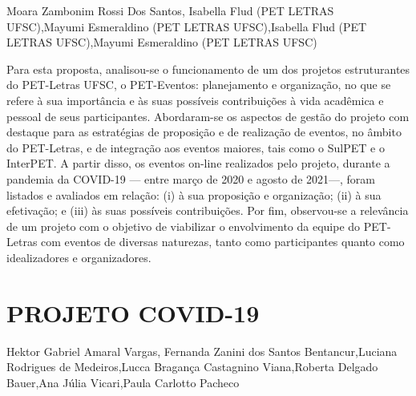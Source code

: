 Moara Zambonim Rossi Dos Santos, Isabella Flud (PET LETRAS UFSC),Mayumi Esmeraldino (PET LETRAS UFSC),Isabella Flud (PET LETRAS UFSC),Mayumi Esmeraldino (PET LETRAS UFSC)

Para esta proposta, analisou-se o funcionamento de um dos projetos estruturantes do PET-Letras UFSC, o PET-Eventos: planejamento e organização, no que se refere à sua importância e às suas possíveis contribuições à vida acadêmica e pessoal de seus participantes. Abordaram-se os aspectos de gestão do projeto com destaque para as estratégias de proposição e de realização de eventos, no âmbito do PET-Letras, e de integração aos eventos maiores, tais como o SulPET e o InterPET. A partir disso, os eventos on-line realizados pelo projeto, durante a pandemia da COVID-19 — entre março de 2020 e agosto de 2021—, foram listados e avaliados em relação: (i) à sua proposição e organização; (ii) à sua efetivação; e (iii) às suas possíveis contribuições. Por fim, observou-se a relevância de um projeto com o objetivo de viabilizar o envolvimento da equipe do PET-Letras com eventos de diversas naturezas, tanto como participantes quanto como idealizadores e organizadores.



\section{PROJETO COVID-19}

Hektor Gabriel Amaral Vargas, Fernanda Zanini dos Santos Bentancur,Luciana Rodrigues de Medeiros,Lucca Bragança Castagnino Viana,Roberta Delgado Bauer,Ana Júlia Vicari,Paula Carlotto Pacheco

